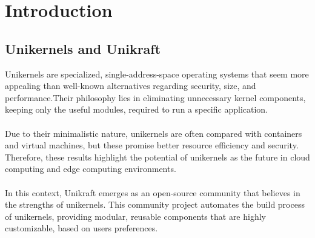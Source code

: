 \chapter{Introduction}
\label{chapter:intro}


\section{Unikernels and Unikraft}
\label{sec:uks}

Unikernels\cite{xen-unikernels} are specialized, single-address-space operating systems that seem  more appealing than well-known alternatives regarding security, size, and performance.\@ Their philosophy lies in eliminating unnecessary kernel components, keeping only the useful modules, required to run a specific application. \\ \\
Due to their minimalistic nature, unikernels are often compared\cite{unikraft-concepts} with containers and virtual machines, but these promise better resource efficiency\cite{unikraft-efficiency} and security\cite{unikraft-security}.\@
Therefore, these results\cite{unikraft-performance} highlight the potential of unikernels as the future in cloud computing and edge computing environments. \\ \\
In this context, Unikraft\cite{unikraft-home} emerges as an open-source community that believes in the strengths of unikernels.\@
This community project automates the build process of unikernels, providing modular, reusable components that are highly customizable, based on users preferences.
\\
